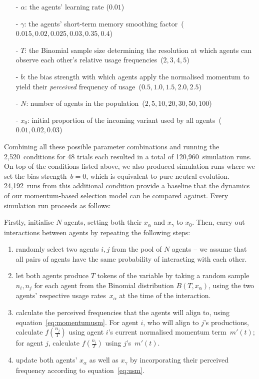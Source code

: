 \documentclass[10pt]{article}
\begin{document}
\begin{itemize}
\item[-] $\alpha$: the agents' learning rate ($0.01$)
\item[-] $\gamma$: the agents' short-term memory smoothing factor~($0.015, 0.02, 0.025, 0.03, 0.35, 0.4$)
\item[-] $T$: the Binomial sample size determining the resolution at which agents can observe each other's relative usage frequencies~($2, 3, 4, 5$)
\item[-] $b$: the bias strength with which agents apply the normalised momentum to yield their \emph{perceived} frequency of usage~($0.5, 1.0, 1.5, 2.0, 2.5$)
\item[-] $N$: number of agents in the population~($2, 5, 10, 20, 30, 50, 100$)
\item[-] $x_0$: initial proportion of the incoming variant used by all agents~($0.01, 0.02, 0.03$)
\end{itemize}

Combining all these possible parameter combinations and running the 2,520~conditions for 48 trials each resulted in a total of 120,960~simulation runs. On top of the conditions listed above, we also produced simulation runs where we set the bias strength~$b=0$, which is equivalent to pure neutral evolution. 24,192~runs from this additional condition provide a baseline that the dynamics of our momentum-based selection model can be compared against. Every simulation run proceeds as follows:

Firstly, initialise $N$ agents, setting both their $x_\alpha$ and $x_\gamma$ to $x_0$. Then, carry out interactions between agents by repeating the following steps:

\begin{enumerate}
\item randomly select two agents $i, j$ from the pool of $N$ agents -- we assume that all pairs of agents have the same probability of interacting with each other.
\item let both agents produce $T$ tokens of the variable by taking a random sample $n_i, n_j$ for each agent from the Binomial distribution $B(T, x_\alpha)$, using the two agents' respective usage rates~$x_\alpha$ at the time of the interaction.
\item calculate the perceived frequencies that the agents will align to, using equation~\ref{eq:momentumusm}. For agent $i$, who will align to $j$'s productions, calculate $f(\frac{n_j}{T})$ using agent $i$'s current normalised momentum term~$m'(t)$; for agent $j$, calculate $f(\frac{n_i}{T})$ using $j$'s~$m'(t)$. 
\item update both agents' $x_\alpha$ as well as $x_\gamma$ by incorporating their perceived frequency according to equation~\ref{eq:usm}.
\end{enumerate}
\end{document}
